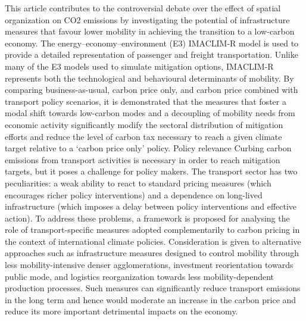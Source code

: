 This article contributes to the controversial debate over the effect of spatial organization on CO2 emissions by investigating the potential of infrastructure measures that favour lower mobility in achieving the transition to a low-carbon economy. The energy–economy–environment (E3) IMACLIM-R model is used to provide a detailed representation of passenger and freight transportation. Unlike many of the E3 models used to simulate mitigation options, IMACLIM-R represents both the technological and behavioural determinants of mobility. By comparing business-as-usual, carbon price only, and carbon price combined with transport policy scenarios, it is demonstrated that the measures that foster a modal shift towards low-carbon modes and a decoupling of mobility needs from economic activity significantly modify the sectoral distribution of mitigation efforts and reduce the level of carbon tax necessary to reach a given climate target relative to a ‘carbon price only’ policy. Policy relevance Curbing carbon emissions from transport activities is necessary in order to reach mitigation targets, but it poses a challenge for policy makers. The transport sector has two peculiarities: a weak ability to react to standard pricing measures (which encourages richer policy interventions) and a dependence on long-lived infrastructure (which imposes a delay between policy interventions and effective action). To address these problems, a framework is proposed for analysing the role of transport-specific measures adopted complementarily to carbon pricing in the context of international climate policies. Consideration is given to alternative approaches such as infrastructure measures designed to control mobility through less mobility-intensive denser agglomerations, investment reorientation towards public mode, and logistics reorganization towards less mobility-dependent production processes. Such measures can significantly reduce transport emissions in the long term and hence would moderate an increase in the carbon price and reduce its more important detrimental impacts on the economy.